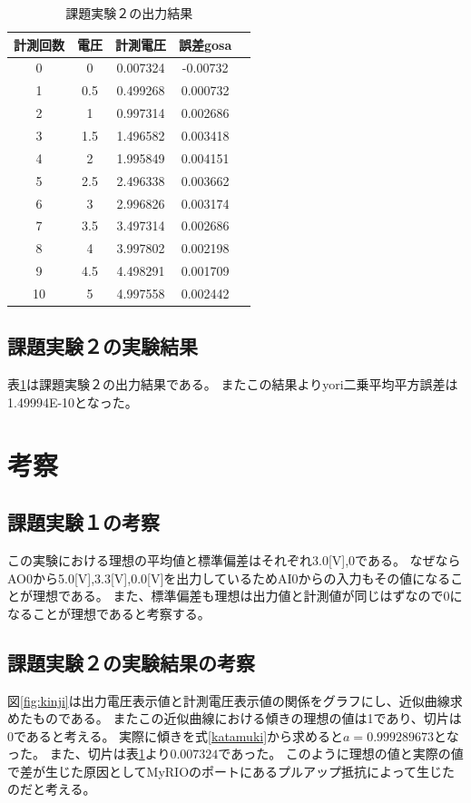 \documentclass[11pt,dvipdfmx]{jarticle}
\begin{document}
				\begin{table}[b]
					\centering
					\caption{課題実験２の出力結果}
					\label{tab:task2}
					\begin{tabular}{|c|c|c|c|c|}
					\hline
					計測回数&電圧&計測電圧&誤差gosa\\
					\hline
					0  & 0   & 0.007324 & -0.00732 \\
					1  & 0.5 & 0.499268 & 0.000732 \\
					2  & 1   & 0.997314 & 0.002686 \\
					3  & 1.5 & 1.496582 & 0.003418 \\
					4  & 2   & 1.995849 & 0.004151 \\
					5  & 2.5 & 2.496338 & 0.003662 \\
					6  & 3   & 2.996826 & 0.003174 \\
					7  & 3.5 & 3.497314 & 0.002686 \\
					8  & 4   & 3.997802 & 0.002198 \\
					9  & 4.5 & 4.498291 & 0.001709 \\
					10 & 5   & 4.997558 & 0.002442\\
					\hline
					\end{tabular}
					\end{table}

	\subsection{課題実験２の実験結果}
		表\ref{tab:task2}は課題実験２の出力結果である。
		またこの結果よりyori二乗平均平方誤差は1.49994E-10となった。
\section{考察}
	\subsection{課題実験１の考察}
	この実験における理想の平均値と標準偏差はそれぞれ3.0[V],0である。
	なぜならAO0から5.0[V],3.3[V],0.0[V]を出力しているためAI0からの入力もその値になることが理想である。
	また、標準偏差も理想は出力値と計測値が同じはずなので0になることが理想であると考察する。

	\subsection{課題実験２の実験結果の考察}
	図\ref{fig:kinji}は出力電圧表示値と計測電圧表示値の関係をグラフにし、近似曲線求めたものである。
	またこの近似曲線における傾きの理想の値は1であり、切片は0であると考える。
	実際に傾きを式\ref{katamuki}から求めると$a=0.999289673$となった。
	また、切片は表\ref{tab:task2}より$0.007324$であった。
	このように理想の値と実際の値で差が生じた原因としてMyRIOのポートにあるプルアップ抵抗によって生じたのだと考える。
\end{document}

